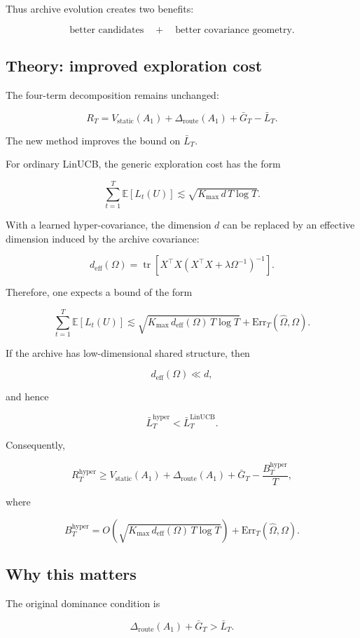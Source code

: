 \documentclass{article} %
\providecommand{\Rstatic}{V_{\mathrm{static}}}
\providecommand{\Droute}{\Delta_{\mathrm{route}}}
\providecommand{\deff}{d_{\mathrm{eff}}}
\providecommand{\Err}{\mathrm{Err}}
\providecommand{\Kmax}{K_{\max}}
\begin{document}
Thus archive evolution creates two benefits:

\[
\text{better candidates} \quad + \quad \text{better covariance geometry}.
\]

\subsection{Theory: improved exploration cost}

The four-term decomposition remains unchanged:

\[
R_T = \Rstatic(A_1) + \Droute(A_1) + \bar{G}_T - \bar{L}_T .
\]

The new method improves the bound on $\bar{L}_T$.

For ordinary LinUCB, the generic exploration cost has the form

\[
\sum_{t=1}^{T} \mathbb{E}[L_t(U)] \lesssim \sqrt{ \Kmax\, d\, T \log T }.
\]

With a learned hyper-covariance, the dimension $d$ can be replaced by an
effective dimension induced by the archive covariance:

\[
\deff(\Omega)
= \operatorname{tr}\!\left[ X^\top X
  \left( X^\top X + \lambda \Omega^{-1} \right)^{-1} \right].
\]

Therefore, one expects a bound of the form

\[
\sum_{t=1}^{T} \mathbb{E}[L_t(U)]
\lesssim \sqrt{ \Kmax\, \deff(\Omega)\, T \log T }
+ \Err_T(\widehat{\Omega}, \Omega).
\]

If the archive has low-dimensional shared structure, then

\[
\deff(\Omega) \ll d,
\]

and hence

\[
\bar{L}_T^{\mathrm{hyper}} < \bar{L}_T^{\mathrm{LinUCB}}.
\]

Consequently,

\[
R_T^{\mathrm{hyper}}
\ge \Rstatic(A_1) + \Droute(A_1) + \bar{G}_T
- \frac{B_T^{\mathrm{hyper}}}{T},
\]

where

\[
B_T^{\mathrm{hyper}}
= O\!\left( \sqrt{ \Kmax\, \deff(\Omega)\, T \log T } \right)
+ \Err_T(\widehat{\Omega}, \Omega).
\]

\subsection{Why this matters}

The original dominance condition is

\[
\Droute(A_1) + \bar{G}_T > \bar{L}_T .
\]
\end{document}
